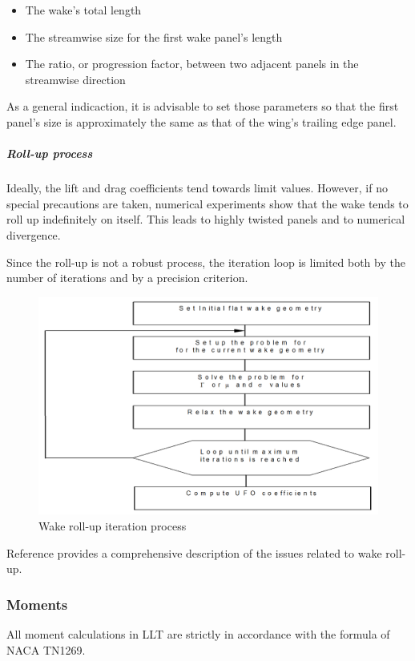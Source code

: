 \documentclass[a4paper,twoside,12pt,dvips]{article}
\begin{document}
\begin{itemize}
\item The wake's total length
\item The streamwise size for the first wake panel's length
\item The ratio, or progression factor, between two adjacent panels in the
streamwise direction
\end{itemize}

As a general indicaction, it is advisable to set those parameters so
that the first panel's size is approximately the same
as that of the wing's trailing edge panel.

\subparagraph{Roll-up process}

Ideally, the lift and drag coefficients tend towards limit values.
However, if no special precautions are taken, numerical experiments
show that the wake tends to roll up indefinitely on itself. This leads
to highly twisted panels and to numerical divergence.

Since the roll-up is not a robust process, the iteration loop is
limited both by the number of iterations and by a precision criterion.

\begin{figure}[htbp]
  \includegraphics[width=0.8\linewidth]{img-32}\centering 
  \caption{Wake roll-up iteration process}
  \label{fig:wake_roll_up_iteration_process}
\end{figure}

Reference \cite{Werner} provides a comprehensive description of the issues related
to wake roll-up.

\subsubsection{Moments}
\label{sec:moments}

All moment calculations in LLT are strictly in accordance with the
formula of NACA TN1269.
\end{document}
